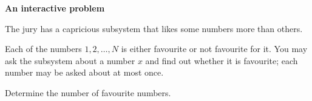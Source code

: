 \textbf{An interactive problem}

The jury has a capricious subsystem that likes some numbers more than others.

Each of the numbers $1, 2, \ldots, N$ is either favourite or not favourite for it. You may ask the subsystem about a number $x$ and find out whether it is favourite; each number may be asked about at most once.

Determine the number of favourite numbers.
